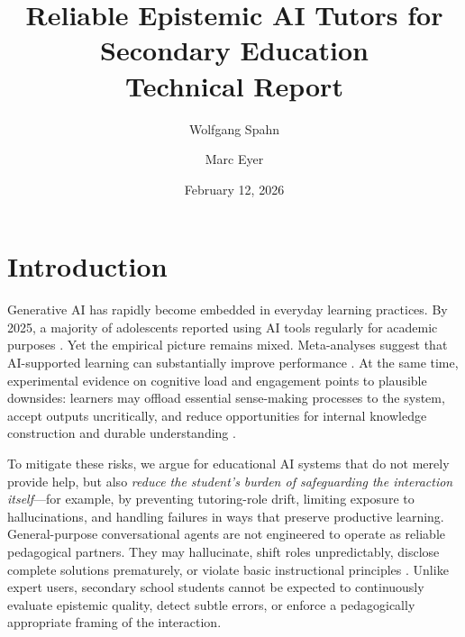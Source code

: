 \documentclass[10pt,twocolumn]{article}
\title{\textbf{Reliable Epistemic AI Tutors for Secondary Education}\\
\large Technical Report}
\author[1]{Wolfgang Spahn}
\author[1]{Marc Eyer}
\affil[1]{PHBern -- University of Teacher Education Bern, Fab 8, Bern, Switzerland}
\affil[ ]{wolfgang.spahn@phbern.ch, marc.eyer@phbern.ch}
\date{February 12, 2026}
\begin{document}

\section{Introduction}\label{introduction}

Generative AI has rapidly become embedded in everyday learning
practices. By 2025, a majority of adolescents reported using AI tools
regularly for academic purposes \citep{tbd}. Yet the empirical
picture remains mixed. Meta-analyses suggest that AI-supported learning
can substantially improve performance \citep{tbd}. At the same time,
experimental evidence on cognitive load and engagement points to
plausible downsides: learners may offload essential sense-making
processes to the system, accept outputs uncritically, and reduce
opportunities for internal knowledge construction and durable
understanding
\citep{kosmyna2025brainchatgptaccumulationcognitive,giannakos2024promise,stadler2024cognitive}.

To mitigate these risks, we argue for educational AI systems that do not
merely provide help, but also \emph{reduce the student's burden of
safeguarding the interaction itself}---for example, by preventing
tutoring-role drift, limiting exposure to hallucinations, and handling
failures in ways that preserve productive learning. General-purpose
conversational agents are not engineered to operate as reliable
pedagogical partners\citep{bang2023education}. They may hallucinate,
shift roles unpredictably, disclose complete solutions prematurely, or
violate basic instructional principles\citep{gan2024llmedu}
\citep{kazemitabaar2024codeaid}. Unlike expert users, secondary
school students cannot be expected to continuously evaluate epistemic
quality, detect subtle errors, or enforce a pedagogically appropriate
framing of the interaction.
\end{document}

